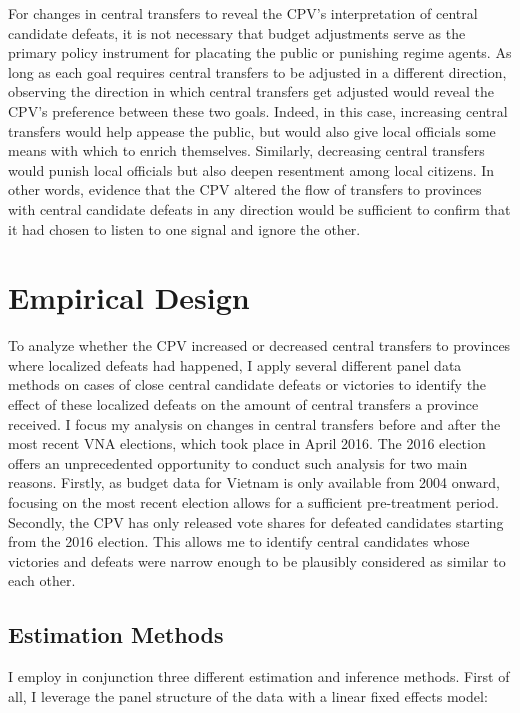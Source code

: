 \documentclass[12pt]{article}
\newcommand{\1}{\mathbbm{1}}
\begin{document}
For changes in central transfers to reveal the CPV's interpretation of central candidate defeats, it is not necessary that budget adjustments serve as the primary policy instrument for placating the public or punishing regime agents. As long as each goal requires central transfers to be adjusted in a different direction, observing the direction in which central transfers get adjusted would reveal the CPV's preference between these two goals. Indeed, in this case, increasing central transfers would help appease the public, but would also give local officials some means with which to enrich themselves. Similarly, decreasing central transfers would punish local officials but also deepen resentment among local citizens. In other words, evidence that the CPV altered the flow of transfers to provinces with central candidate defeats in any direction would be sufficient to confirm that it had chosen to listen to one signal and ignore the other.

\section{Empirical Design}
\label{sec:methods}

To analyze whether the CPV increased or decreased central transfers to provinces where localized defeats had happened, I apply several different panel data methods on cases of close central candidate defeats or victories to identify the effect of these localized defeats on the amount of central transfers a province received. I focus my analysis on changes in central transfers before and after the most recent VNA elections, which took place in April 2016. The 2016 election offers an unprecedented opportunity to conduct such analysis for two main reasons. Firstly, as budget data for Vietnam is only available from 2004 onward, focusing on the most recent election allows for a sufficient pre-treatment period. Secondly, the CPV has only released vote shares for defeated candidates starting from the 2016 election. This allows me to identify central candidates whose victories and defeats were narrow enough to be plausibly considered as similar to each other.

\subsection{Estimation Methods}
\label{sec:methods_estimation}
I employ in conjunction three different estimation and inference methods. First of all, I leverage the panel structure of the data with a linear fixed effects model:
\end{document}
